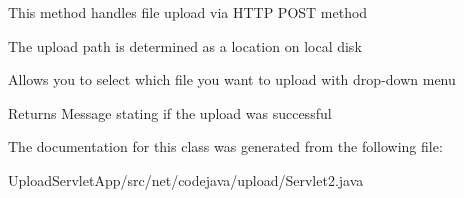 \begin{DoxyItemize}
\item This method handles file upload via H\+T\+T\+P P\+O\+S\+T method
\item The upload path is determined as a location on local disk
\item Allows you to select which file you want to upload with drop-\/down menu \begin{DoxyReturn}{Returns}
Message stating if the upload was successful 
\end{DoxyReturn}

\end{DoxyItemize}

The documentation for this class was generated from the following file\+:\begin{DoxyCompactItemize}
\item 
Upload\+Servlet\+App/src/net/codejava/upload/Servlet2.\+java\end{DoxyCompactItemize}
